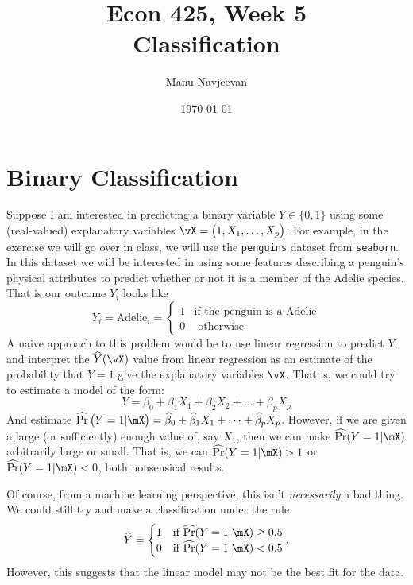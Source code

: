 \documentclass[10pt]{article}
\title{Econ 425, Week 5 \\ \Large Classification}%
\author{Manu Navjeevan}
\date{\today}
\begin{document}
\maketitle

\section{Binary Classification}%
\label{sec:binary}

Suppose I am interested in predicting a binary variable \(Y \in \{0,1\} \) using some (real-valued) explanatory variables \(\vX = \left(1, X_1,\dots,X_p\right)\). For example, in the exercise we will go over in class, we will use the \verb|penguins| dataset from \verb|seaborn|. In this dataset we will be interested in using some features describing a penguin's physical attributes to predict whether or not it is a member of the Adelie species. That is our outcome \(Y_i\) looks like
\[
	Y_i = \text{Adelie}_i = \begin{cases}
		1 & \text{if the penguin is a Adelie} \\
		0 & \text{ otherwise }
	\end{cases}	
\] 
A naive approach to this problem would be to use linear regression to predict \(Y\), and interpret the  \(\widehat Y(\vX)\) value from linear regression as an estimate of the probability that \(Y = 1\) give the explanatory variables \(\vX\). That is, we could try to estimate a model of the form:
\begin{equation}
	\label{eq:lpm}
    Y = \beta_0 + \beta_1 X_1 + \beta_2 X_2 + \dots + \beta_p X_p
\end{equation}
And estimate \(\widehat{\Pr}\left(Y=1|\mX\right) = \widehat{\beta}_0 + \widehat\beta_1X_1 + \dots+\widehat{\beta}_p X_p\). However, if we are given a large (or sufficiently) enough value of, say \(X_1\), then we can make \(\widehat{\Pr}(Y=1|\mX)\) arbitrarily large or small. That is, we can \(\widehat{\Pr}(Y=1|\mX) > 1\) or \(\widehat{\Pr}(Y=1|\mX) < 0\), both nonsensical results.

Of course, from a machine learning perspective, this isn't \textit{necessarily} a bad thing. We could still try and make a classification under the rule:
\[
	\widehat{Y} = \begin{cases}
		1 & \text{if }\widehat{\Pr}(Y=1|\mX)  \geq 0.5\\ 
		0 & \text{if }\widehat{\Pr}(Y=1|\mX) < 0.5
	\end{cases}	
.\] 
However, this suggests that the linear model may not be the best fit for the data.
\end{document}
